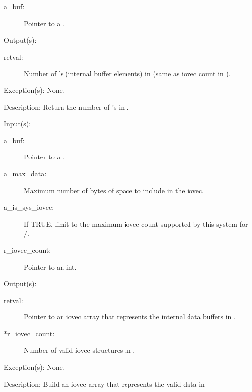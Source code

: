 \begin{capi}
\begin{capilist}
		\begin{description}\item[]
		\item[a\_buf: ]
			Pointer to a .
		\end{description}
	\item[Output(s): ]
		\begin{description}\item[]
		\item[retval: ]
			Number of 's (internal buffer elements)
			in  (same as iovec count in
			).
		\end{description}
	\item[Exception(s): ] None.
	\item[Description: ]
		Return the number of 's in .
	\end{capilist}
\label{buf_iovec_get}
	\begin{capilist}
	\item[Input(s): ]
		\begin{description}\item[]
		\item[a\_buf: ]
			Pointer to a .
		\item[a\_max\_data: ]
			Maximum number of bytes of space to include in the
			iovec.
		\item[a\_is\_sys\_iovec: ]
			If TRUE, limit  to the maximum
			iovec count supported by this system for
			/.
		\item[r\_iovec\_count: ]
			Pointer to an int.
		\end{description}
	\item[Output(s): ]
		\begin{description}\item[]
		\item[retval: ]
			Pointer to an iovec array that represents the internal
			data buffers in .
		\item[*r\_iovec\_count: ]
			Number of valid iovec structures in .
		\end{description}
	\item[Exception(s): ] None.
	\item[Description: ]
		Build an iovec array that represents the valid data in

\end{capilist}
\end{capi}
